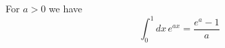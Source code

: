 \documentclass{article}
\begin{document}
For $a>0$ we have
\begin{equation}
\int_0^1 dx\, e^{a x} = \frac{e^{a}-1}{a}
\end{equation}
\end{document}
